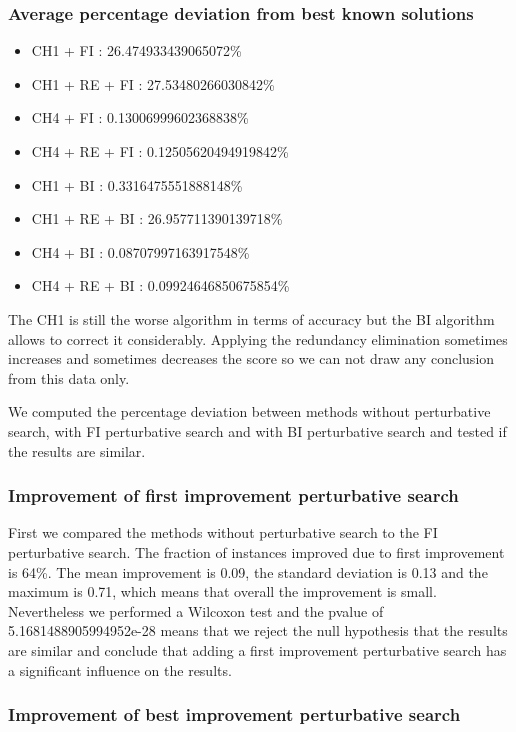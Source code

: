 \documentclass[a4paper,12pt]{article}
\begin{document}
\subsubsection{Average percentage deviation from best known solutions}

\begin{itemize}
    \item CH1 + FI : 26.474933439065072\%
    \item CH1 + RE + FI : 27.53480266030842\%
    \item CH4 + FI : 0.13006999602368838\%
    \item CH4 + RE + FI : 0.12505620494919842\%
    \item CH1 + BI : 0.3316475551888148\%
    \item CH1 + RE + BI : 26.957711390139718\%
    \item CH4 + BI : 0.08707997163917548\%
    \item CH4 + RE + BI : 0.09924646850675854\%
\end{itemize}

The CH1 is still the worse algorithm in terms of accuracy but the BI algorithm allows to correct it considerably. Applying the redundancy elimination sometimes increases and sometimes decreases the score so we can not draw any conclusion from this data only.

We computed the percentage deviation between methods without perturbative search, with FI perturbative search and with BI perturbative search and tested if the results are similar.

\subsubsection{Improvement of first improvement perturbative search}

First we compared the methods without perturbative search to the FI perturbative search. The fraction of instances improved due to first improvement is 64\%. The mean improvement is 0.09, the standard deviation is 0.13 and the maximum is 0.71, which means that overall the improvement is small.
Nevertheless we performed a Wilcoxon test and the pvalue of 5.1681488905994952e-28 means that we reject the null hypothesis that the results are similar and conclude that adding a first improvement perturbative search has a significant influence on the results.

\subsubsection{Improvement of best improvement perturbative search}
\end{document}
